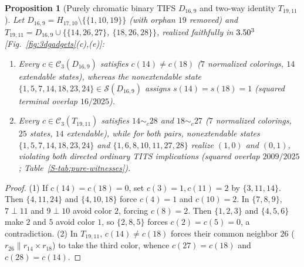 \documentclass[aps,pra,reprint,superscriptaddress,longbibliography,nofootinbib,floatfix,10pt]{revtex4-2}
\newtheorem{proposition}[theorem]{Proposition}
\theoremstyle{definition}\newtheorem{definition}[theorem]{Definition}
\theoremstyle{remark}\newtheorem{remark}[theorem]{Remark}
\newcommand{\Sc}{\mathcal S}\newcommand{\Cc}{\mathcal C}
\begin{document}
\begin{proposition}[Purely chromatic binary TIFS $D_{16,9}$ and two-way identity $T_{19,11}$]\label{prop:pure-tifs}\label{prop:pure-tits}
Let $D_{16,9}=H_{17,10}\setminus\{\{1,10,19\}\}$ (with orphan $19$ removed) and $T_{19,11}=D_{16,9}\cup\{\{14,26,27\}$, $\{18,26,28\}\}$, realized faithfully in $3.50^3$ [Fig.~\ref{fig:3dgadgets}(c),(e)]:
\begin{enumerate}
\item Every $c\in\Cc_3(D_{16,9})$ satisfies $c(14)\ne c(18)$ ($7$ normalized colorings, $14$ extendable states), whereas the nonextendable state $\{1,5,7,14,18,23,24\}\in\Sc(D_{16,9})$ assigns $s(14)=s(18)=1$ (squared terminal overlap $16/2025$).
\item Every $c\in\Cc_3(T_{19,11})$ satisfies $14\sim_c 28$ and $18\sim_c 27$ ($7$ normalized colorings, $25$ states, $14$ extendable), while for both pairs, nonextendable states $\{1,5,7,14,18,23,24\}$ and $\{1,6,8,10,11,27,28\}$ realize $(1,0)$ and $(0,1)$, violating both directed ordinary TITS implications (squared overlap $2009/2025$; Table~\ref{S-tab:pure-witnesses}).
\end{enumerate}
\end{proposition}
\begin{proof}
(1) If $c(14)=c(18)=0$, set $c(3)=1,c(11)=2$ by $\{3,11,14\}$. Then $\{4,11,24\}$ and $\{4,10,18\}$ force $c(4)=1$ and $c(10)=2$. In $\{7,8,9\}$, $7\perp 11$ and $9\perp 10$ avoid color $2$, forcing $c(8)=2$. Then $\{1,2,3\}$ and $\{4,5,6\}$ make $2$ and $5$ avoid color $1$, so $\{2,8,5\}$ forces $c(2)=c(5)=0$, a contradiction. (2) In $T_{19,11}$, $c(14)\ne c(18)$ forces their common neighbor $26$ ($r_{26}\parallel r_{14}\times r_{18}$) to take the third color, whence $c(27)=c(18)$ and $c(28)=c(14)$.
\end{proof}
\end{document}
